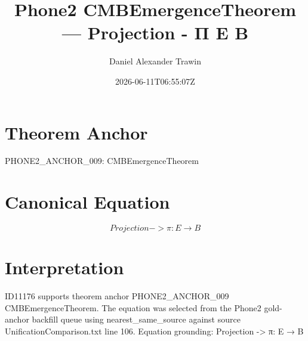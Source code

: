 \documentclass[11pt]{article}
\title{Phone2 CMBEmergenceTheorem — Projection - Π E B}
\author{Daniel Alexander Trawin}
\date{2026-06-11T06:55:07Z}
\begin{document}
\maketitle
\section*{Theorem Anchor}
PHONE2_ANCHOR_009: CMBEmergenceTheorem
\section*{Canonical Equation}
\[
Projection -> π: E → B
\]
\section*{Interpretation}
ID11176 supports theorem anchor PHONE2_ANCHOR_009 CMBEmergenceTheorem. The equation was selected from the Phone2 gold-anchor backfill queue using nearest_same_source against source UnificationComparison.txt line 106. Equation grounding: Projection -> π: E → B
\end{document}
